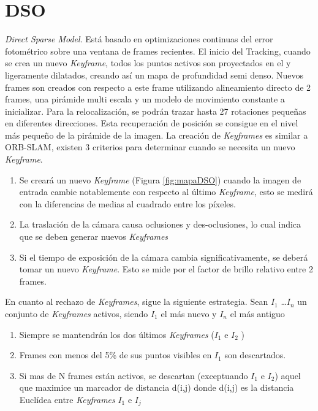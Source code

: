 \section{DSO}
\textit{Direct Sparse Model}.
Está basado en optimizaciones continuas del error fotométrico sobre una ventana de frames recientes\cite{Engel2016direct}.
El inicio del Tracking, cuando se crea un nuevo \textit{Keyframe}, todos los puntos activos son proyectados en el y ligeramente dilatados, creando así un mapa de profundidad semi denso. Nuevos frames son creados con respecto a este frame utilizando alineamiento directo de 2 frames, una pirámide multi escala y un modelo de movimiento constante a inicializar. 
Para la relocalización, se podrán trazar hasta 27 rotaciones pequeñas en diferentes direcciones. Esta recuperación de posición se consigue en el nivel más pequeño de la pirámide de la imagen.
La creación de \textit{Keyframes} es similar a ORB-SLAM, existen 3 criterios para determinar cuando se necesita un nuevo \textit{Keyframe}.
\begin {enumerate}
\item Se creará un nuevo \textit{Keyframe} (Figura \ref{fig:mapaDSO}) cuando la imagen de entrada cambie notablemente con respecto al último \textit{Keyframe}, esto se medirá con la diferencias de medias al cuadrado entre los píxeles.
\item La traslación de la cámara causa oclusiones y des-oclusiones, lo cual indica que se deben generar nuevos \textit{Keyframes}
\item Si el tiempo de exposición de la cámara cambia significativamente, se deberá tomar un nuevo \textit{Keyframe}. Esto se mide por el factor de brillo relativo entre 2 frames. 
\end {enumerate}

En cuanto al rechazo de \textit{Keyframes}, sigue la siguiente estrategia. Sean $I_1$ \dots $I_n$ un conjunto de \textit{Keyframes} activos, siendo $I_1$ el más nuevo y $I_n$ el más antiguo
\begin {enumerate}
\item Siempre se mantendrán los dos últimos \textit{Keyframes} ($I_1$  e $I_2$ )
\item Frames con menos del 5\% de sus puntos visibles en $I_1$  son descartados.
\item Si mas de N frames están activos, se descartan (exceptuando $I_1$  e $I_2$) aquel que maximice un marcador de distancia d(i,j) donde d(i,j) es la distancia Euclídea entre \textit{Keyframes} $I_1$  e $I_j$
\end {enumerate}

